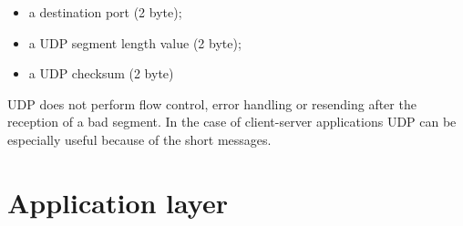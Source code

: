 \documentclass[margin=0px]{article}
\begin{document}
\begin{description}
\begin{itemize}
\begin{itemize}
                      \item a destination port (2 byte);
                      \item a UDP segment length value (2 byte);
                      \item a UDP checksum (2 byte)
                  \end{itemize}
                  UDP does not perform flow control, error handling or resending after the reception of a bad segment. In the case of client-server applications UDP can be especially useful because of the short messages.
        \end{itemize}
\end{description}

\section{Application layer}
\end{document}
